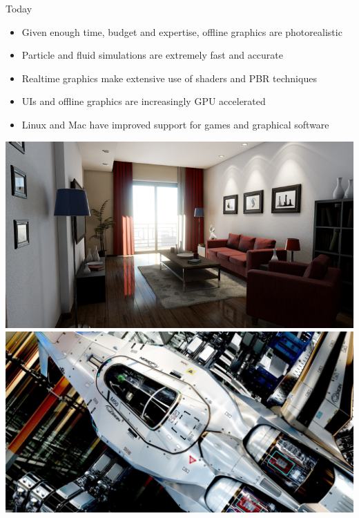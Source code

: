 \documentclass{lug}
\begin{document}
\begin{frame}{Today}
    \noindent
    \begin{minipage}{.65\textwidth - 2em}
        \small
        \begin{itemize}
            \item Given enough time, budget and expertise, offline graphics are photorealistic
            \item Particle and fluid simulations are extremely fast and accurate
            \item Realtime graphics make extensive use of shaders and PBR techniques
            \item UIs and offline graphics are increasingly GPU accelerated
            \item Linux and Mac have improved support for games and graphical software
        \end{itemize}
    \end{minipage}%
    \hspace{1.5em}%
    \begin{minipage}{.35\textwidth}
        \includegraphics[width=\textwidth]{graphics/unreal4_damn} \\
        \includegraphics[width=\textwidth]{graphics/star_citizen_pbr} \\

\end{minipage}
\end{frame}
\end{document}
